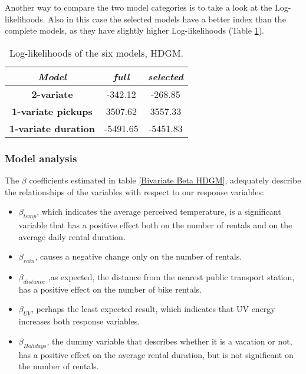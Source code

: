 \noindent
Another way to compare the two model categories is to take a look at the Log-likelihoods. Also in this case the selected models have a better index than the complete models, as they have slightly higher Log-likelihoods (Table \ref{Log-likelihoods HDGM}). 

\begin{table}
	\centering
	\renewcommand\arraystretch{1.3}
	\begin{tabular}{c|c|c}
		\hline
		\textit{Model} &\textit{full } & \textit{selected} \\ 
		\hline
		\textbf{2-variate } & -342.12  & -268.85    \\ 
		\hline
		\textbf{1-variate pickups } & 3507.62  & 3557.33    \\ 
		\hline
		\textbf{1-variate duration} & -5491.65  & -5451.83   \\ 
		\hline
	\end{tabular}
	\caption[Log-likelihoods of the six models (HDGM)]{Log-likelihoods of the six models, HDGM.}
	\label{Log-likelihoods HDGM}
\end{table}

\subsubsection{Model analysis} 
The $\beta$ coefficients estimated in table \ref*{Bivariate Beta HDGM},
adequately describe the relationships of the variables with respect to our response variables:
\begin{itemize}
	\item $\beta_{temp}$, which indicates the average perceived temperature, is a significant variable that has a positive effect both on the number of rentals and on the average daily rental duration.
	\item $\beta_{rain}$, causes a negative change only on the number of rentals.
	\item $\beta_{distance}$ ,as expected, the distance from the nearest public transport station, has a positive effect on the number of bike rentals.
	\item $\beta_{UV}$, perhaps the least expected result, which indicates that UV energy increases both response variables.
	\item $\beta_{Holidays}$, the dummy variable that describes whether it is a vacation or not, has a positive effect on the average rental duration, but is not significant on the number of rentals.
\end{itemize}

